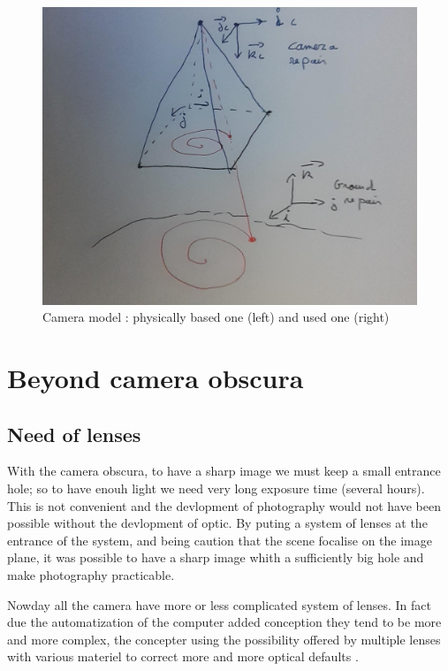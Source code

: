 \begin{figure}
\centering
	\includegraphics[width=12cm]{Methods/Images/RepairCam.jpg}
	\caption{Camera model : physically based one (left) and used one (right)}
	\label{fig:FormIm}
\end{figure}


\section{Beyond camera obscura}

\subsection{Need of lenses}

With the camera obscura, to have a sharp image we must keep a small entrance hole;
so to have enouh light we need very long exposure time (several hours). 
This is not convenient and the devlopment of photography
would not have been possible without the devlopment of optic. By puting a system
of lenses at the entrance of the system, and being caution that the  scene focalise
on the image plane, it was possible to have a sharp image whith a sufficiently big
hole and make photography practicable.

Nowday all the camera have more or less complicated system of lenses. In fact due the
automatization of the computer added conception they tend to be more and more complex, the concepter
using the possibility offered by multiple lenses with various materiel to correct more and more optical defaults .

